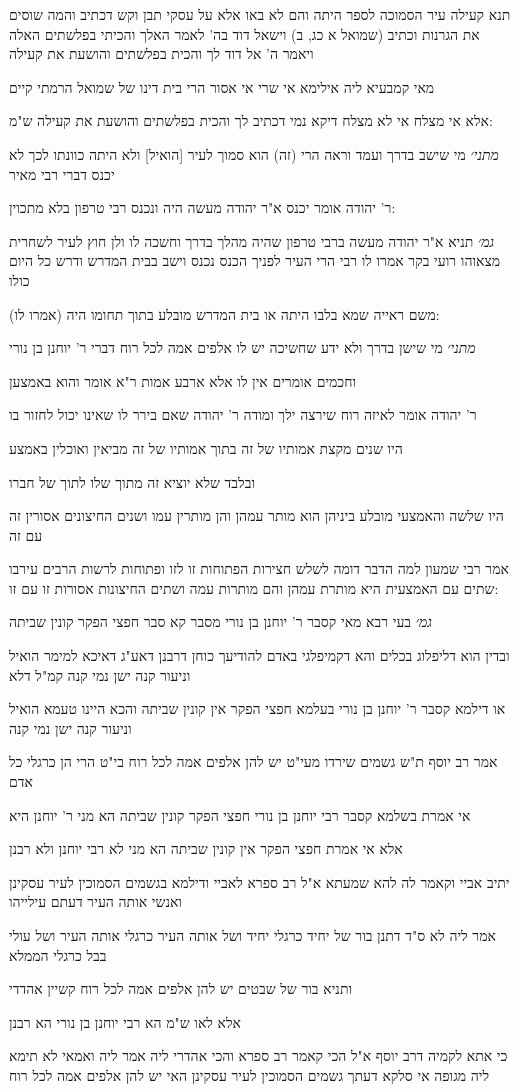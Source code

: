 \documentclass[12pt, openany]{book}
\newcommand{\sethebfont}{
\fontsize{10.5pt}{21.0pt} \selectfont
}
\newcommand{\textblock}[1]{
{\sethebfont #1\\}	
}
\begin{document}
\textblock{תנא קעילה עיר הסמוכה לספר היתה והם לא באו אלא על עסקי תבן וקש דכתיב והמה שוסים את הגרנות וכתיב (שמואל א כג, ב) וישאל דוד בה' לאמר האלך והכיתי בפלשתים האלה ויאמר ה' אל דוד לך והכית בפלשתים והושעת את קעילה}
\textblock{מאי קמבעיא ליה אילימא אי שרי אי אסור הרי בית דינו של שמואל הרמתי קיים}
\textblock{אלא אי מצלח אי לא מצלח דיקא נמי דכתיב לך והכית בפלשתים והושעת את קעילה ש"מ:}
\textblock{{\large\emph{מתני׳}} מי שישב בדרך ועמד וראה הרי (זה) הוא סמוך לעיר [הואיל] ולא היתה כוונתו לכך לא יכנס דברי רבי מאיר}
\textblock{ר' יהודה אומר יכנס א"ר יהודה מעשה היה ונכנס רבי טרפון בלא מתכוין:}
\textblock{{\large\emph{גמ׳}} תניא א"ר יהודה מעשה ברבי טרפון שהיה מהלך בדרך וחשכה לו ולן חוץ לעיר לשחרית מצאוהו רועי בקר אמרו לו רבי הרי העיר לפניך הכנס נכנס וישב בבית המדרש ודרש כל היום כולו}
\textblock{(אמרו לו) משם ראייה שמא בלבו היתה או בית המדרש מובלע בתוך תחומו היה:}
\textblock{{\large\emph{מתני׳}} מי שישן בדרך ולא ידע שחשיכה יש לו אלפים אמה לכל רוח דברי ר' יוחנן בן נורי}
\textblock{וחכמים אומרים אין לו אלא ארבע אמות ר"א אומר והוא באמצען}
\textblock{ר' יהודה אומר לאיזה רוח שירצה ילך ומודה ר' יהודה שאם בירר לו שאינו יכול לחזור בו}
\textblock{היו שנים מקצת אמותיו של זה בתוך אמותיו של זה מביאין ואוכלין באמצע}
\textblock{ובלבד שלא יוציא זה מתוך שלו לתוך של חברו}
\textblock{היו שלשה והאמצעי מובלע ביניהן הוא מותר עמהן והן מותרין עמו ושנים החיצונים אסורין זה עם זה}
\textblock{אמר רבי שמעון למה הדבר דומה לשלש חצירות הפתוחות זו לזו ופתוחות לרשות הרבים עירבו שתים עם האמצעית היא מותרת עמהן והם מותרות עמה ושתים החיצונות אסורות זו עם זו:}
\textblock{{\large\emph{גמ׳}} בעי רבא מאי קסבר ר' יוחנן בן נורי מסבר קא סבר חפצי הפקר קונין שביתה}
\textblock{ובדין הוא דליפלוג בכלים והא דקמיפלגי באדם להודיעך כוחן דרבנן דאע"ג דאיכא למימר הואיל וניעור קנה ישן נמי קנה קמ"ל דלא}
\textblock{או דילמא קסבר ר' יוחנן בן נורי בעלמא חפצי הפקר אין קונין שביתה והכא היינו טעמא הואיל וניעור קנה ישן נמי קנה}
\textblock{אמר רב יוסף ת"ש גשמים שירדו מעי"ט יש להן אלפים אמה לכל רוח בי"ט הרי הן כרגלי כל אדם}
\textblock{אי אמרת בשלמא קסבר רבי יוחנן בן נורי חפצי הפקר קונין שביתה הא מני ר' יוחנן היא}
\textblock{אלא אי אמרת חפצי הפקר אין קונין שביתה הא מני לא רבי יוחנן ולא רבנן}
\textblock{יתיב אביי וקאמר לה להא שמעתא א"ל רב ספרא לאביי ודילמא בגשמים הסמוכין לעיר עסקינן ואנשי אותה העיר דעתם עילייהו}
\textblock{אמר ליה לא ס"ד דתנן בור של יחיד כרגלי יחיד ושל אותה העיר כרגלי אותה העיר ושל עולי בבל כרגלי הממלא}
\textblock{ותניא בור של שבטים יש להן אלפים אמה לכל רוח קשיין אהדדי}
\textblock{אלא לאו ש"מ הא רבי יוחנן בן נורי הא רבנן}
\textblock{כי אתא לקמיה דרב יוסף א"ל הכי קאמר רב ספרא והכי אהדרי ליה אמר ליה ואמאי לא תימא ליה מגופה אי סלקא דעתך גשמים הסמוכין לעיר עסקינן האי יש להן אלפים אמה לכל רוח}
\end{document}

